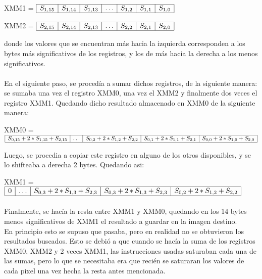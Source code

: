 \documentclass[11pt, a4paper]{article}
\begin{document}
\begin{center}
XMM1 = $\begin{array}{|c|c|c|c|c|c|c|}
\hline
S_{1,15} & S_{1,14} & S_{1,13} & \ldots & S_{1,2} & S_{1,1} & S_{1,0}\\
\hline
\end{array} $
\end{center}

\begin{center}
XMM2 = $\begin{array}{|c|c|c|c|c|c|c|}
\hline
S_{2,15} & S_{2,14} & S_{2,13} & \ldots & S_{2,2} & S_{2,1} & S_{2,0}\\
\hline
\end{array} $
\end{center}

donde los valores que se encuentran m\'as hacia la izquierda corresponden a los bytes m\'as significativos de los registros, y los de m\'as hacia la derecha a los menos significativos.

\paragraph{}
En el siguiente paso, se proced\'ia a sumar dichos registros, de la siguiente manera: se sumaba una vez el registro XMM0, una vez el XMM2 y finalmente dos veces el registro XMM1. Quedando dicho resultado almacenado en XMM0 de la siguiente manera:

\begin{center}
XMM0 = $\begin{array}{|c|c|c|c|c|}
\hline
S_{0,15} + 2*S_{1,15} + S_{2,15} & \ldots & S_{0,2} + 2*S_{1,2} + S_{2,2} & S_{0,1} + 2*S_{1,1} + S_{2,1} & S_{0,0} + 2*S_{1,0} + S_{2,0}\\
\hline
\end{array} $
\end{center}

Luego, se procedia a copiar este registro en alguno de los otros disponibles, y se lo shifteaba a derecha 2 bytes. Quedando asi:

\begin{center}
XMM1 = $\begin{array}{|c|c|c|c|c|}
\hline
0 & \ldots & S_{0,3} + 2*S_{1,3} + S_{2,3} & S_{0,3} + 2*S_{1,3} + S_{2,3} & S_{0,2} + 2*S_{1,2} + S_{2,2}\\
\hline
\end{array} $
\end{center}

\paragraph{}
Finalmente, se hac\'ia la resta entre XMM1 y XMM0, quedando en los 14 bytes menos significativos de XMM1 el resultado a guardar en la imagen destino.\\
En principio esto se supuso que pasaba, pero en realidad no se obtuvieron los resultados buscados. Esto se debi\'o a que cuando se hac\'ia la suma de los registros XMM0, XMM2 y 2 veces XMM1, las instrucciones usadas saturaban cada una de las sumas, pero lo que se necesitaba era que reci\'en se saturaran los valores de cada pixel una vez hecha la resta antes mencionada.
\end{document}
